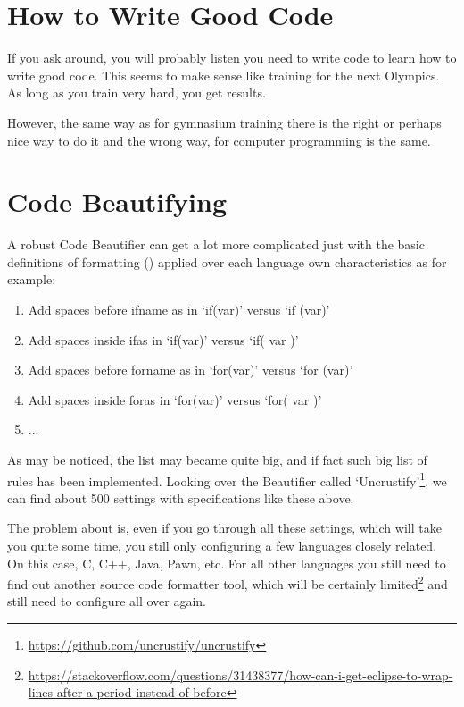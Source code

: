     \section{How to Write Good Code}

    If you ask around, you will probably listen you need to write code to learn
    how to write good code. This seems to make sense like training for the next
    Olympics. As long as you train very hard, you get results.

    However, the same way as for gymnasium training there is the right or
    perhaps nice way to do it and the wrong way, for computer programming is the
    same.



    \section{Code Beautifying}

    A robust Code Beautifier can get a lot more complicated just with the basic
    definitions of formatting ()
    applied over each language own characteristics
    as for example:

    \begin{enumerate}
        \item Add spaces before if\s name as in `if(var)' versus `if (var)'
        \item Add spaces inside if\s as in `if(var)' versus `if( var )'
        \item Add spaces before for\s name as in `for(var)' versus `for (var)'
        \item Add spaces inside for\s as in `for(var)' versus `for( var )'
        \item ...
    \end{enumerate}

    As may be noticed, the list may became quite big, and if fact such big list
    of rules has been implemented.
    Looking over the Beautifier called `Uncrustify'\footnote{\url{https://github.com/uncrustify/uncrustify}},
    we can find about 500 settings with specifications like these above.

    The problem about is,
    even if you go through all these settings,
    which will take you quite some time,
    you still only configuring a few languages closely related.
    On this case, C, C++, Java, Pawn, etc.
    For all other languages you still need to find out another source code formatter tool,
    which will be certainly limited\footnote{\url{https://stackoverflow.com/questions/31438377/how-can-i-get-eclipse-to-wrap-lines-after-a-period-instead-of-before}}
    and still need to configure all over again.


